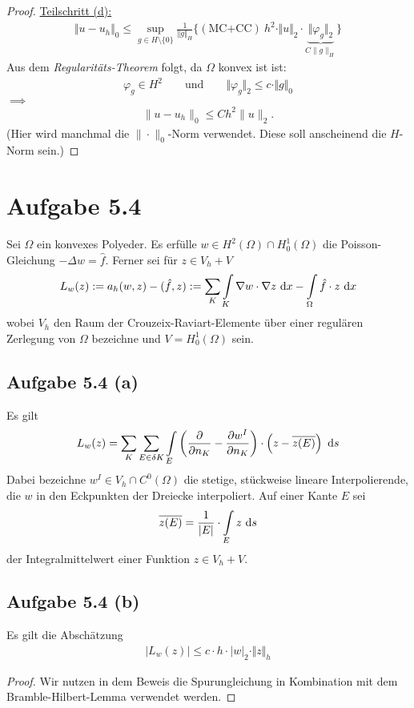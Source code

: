 \documentclass[12pt,a4paper]{article}
\begin{document}
\begin{proof}

\underline{Teilschritt (d):}
\begin{align*}
\Vert u-u_h\Vert_0\leq\sup\limits_{g\in H\setminus\lbrace0\rbrace}\frac{1}{\Vert g\Vert_H}\big\lbrace(\text{MC+CC})~h^2\cdot\Vert u\Vert_2\cdot\underbrace{\Vert\varphi_g\Vert_2}_{C\|g\|_H}\big\rbrace
\end{align*}
Aus dem \textit{Regularitäts-Theorem} folgt, da $\Omega$ konvex ist ist:
\begin{align*}
\varphi_g\in H^2\qquad\text{und}\qquad\Vert\varphi_g\Vert_2\leq c\cdot\Vert g\Vert_0
\end{align*}
$\implies$ 
\begin{align*}
	\|u-u_h\|_0 \leq C h^2 \|u\|_2.
\end{align*}
(Hier wird manchmal die $\|\cdot\|_0$-Norm verwendet. Diese soll anscheinend die $H$-Norm sein.)
\end{proof}

\section*{Aufgabe 5.4}
Sei $\Omega$ ein konvexes Polyeder. Es erfülle $w\in H^2(\Omega)\cap H_0^1(\Omega)$ die Poisson-Gleichung $-\Delta w=\hat{f}$. Ferner sei für $z\in V_h+V$
\begin{align*}
L_w(z):=a_h(w,z)-(\hat{f},z):=\sum\limits_K\int\limits_K\nabla w\cdot\nabla z\text{ d} x-\int\limits_\Omega\hat{f}\cdot z\text{ d} x
\end{align*}
wobei $V_h$ den Raum der Crouzeix-Raviart-Elemente über einer regulären Zerlegung von $\Omega$ bezeichne und $V=H_0^1(\Omega)$ sein.

\subsection*{Aufgabe 5.4 (a)}
Es gilt
\begin{align*}
L_w(z)=\sum\limits_K\sum\limits_{E\in\delta K}\int\limits_E\left(\frac{\partial}{\partial n_K}-\frac{\partial w^I}{\partial n_K}\right)\cdot\left(z-\overline{z(E)}\right)\text{ d} s
\end{align*}
Dabei bezeichne $w^I\in V_h\cap C^0(\Omega)$ die stetige, stückweise lineare Interpolierende, die $w$ in den Eckpunkten der Dreiecke interpoliert. Auf einer Kante $E$ sei
\begin{align*}
\overline{z(E)}=\frac{1}{|E|}\cdot\int\limits_E z\text{ d} s
\end{align*}
der Integralmittelwert einer Funktion $z\in V_h+V$.

\subsection*{Aufgabe 5.4 (b)}
Es gilt die Abschätzung
\begin{align*}
\big|L_w(z)\big|\leq c\cdot h\cdot|w|_2\cdot\Vert z\Vert_h
\end{align*}
\begin{proof}
Wir nutzen in dem Beweis die Spurungleichung in Kombination mit dem Bramble-Hilbert-Lemma verwendet werden.
\end{proof}
\end{document}
